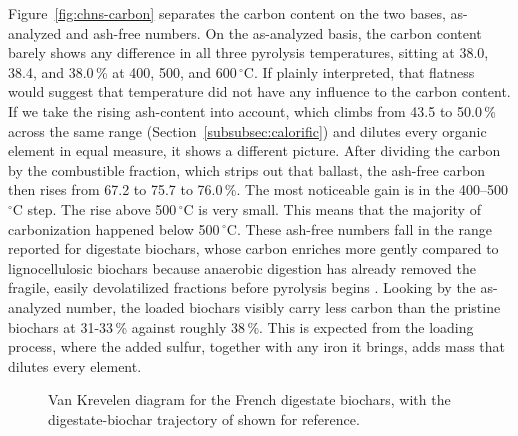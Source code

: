 Figure~\ref{fig:chns-carbon} separates the carbon content on the two bases, as-analyzed and ash-free numbers. On the as-analyzed basis, the carbon content barely shows any difference in all three pyrolysis temperatures, sitting at 38.0, 38.4, and 38.0\,\% at 400, 500, and 600\,$^{\circ}$C. If plainly interpreted, that flatness would suggest that temperature did not have any influence to the carbon content. If we take the rising ash-content into account, which climbs from 43.5 to 50.0\,\% across the same range (Section~\ref{subsubsec:calorific}) and dilutes every organic element in equal measure, it shows a different picture. After dividing the carbon by the combustible fraction, which strips out that ballast, the ash-free carbon then rises from 67.2 to 75.7 to 76.0\,\%. The most noticeable gain is in the  400--500\,$^{\circ}$C step. The rise above 500\,$^{\circ}$C is very small. This means that the majority of carbonization happened below 500\,$^{\circ}$C. These ash-free numbers fall in the range reported for digestate biochars, whose carbon enriches more gently compared to lignocellulosic biochars because anaerobic digestion has already removed the fragile, easily devolatilized fractions before pyrolysis begins \cite{kujawska-2026}. 
Looking by the as-analyzed number, the loaded biochars visibly carry less carbon than the pristine biochars at 31-33\,\% against roughly 38\,\%. This is expected from the loading process, where the added sulfur, together with any iron it brings, adds mass that dilutes every element. 


\begin{figure}[ht]
\centering
{}
\caption{Van Krevelen diagram for the French digestate biochars, with the digestate-biochar trajectory of \textcite{kujawska-2026} shown for reference.}
\label{fig:chns-vankrevelen}
\end{figure}

